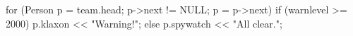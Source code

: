 for (Person p = team.head; p->next != NULL; p = p->next) {
    if (warnlevel >= 2000) {
        p.klaxon << "Warning!";
    }  else {
        p.spywatch << "All clear.";
    }
}